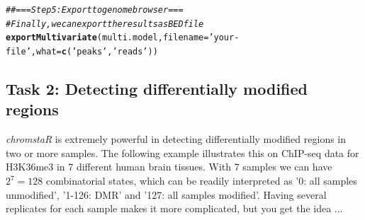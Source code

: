 \documentclass[11pt]{article}\usepackage[]{graphicx}\usepackage[]{color}
\makeatletter
\newcommand{\hlstr}[1]{\textcolor[rgb]{0.192,0.494,0.8}{#1}}%
\newcommand{\hlcom}[1]{\textcolor[rgb]{0.678,0.584,0.686}{\textit{#1}}}%
\newcommand{\hlstd}[1]{\textcolor[rgb]{0.345,0.345,0.345}{#1}}%
\newcommand{\hlkwc}[1]{\textcolor[rgb]{0.333,0.667,0.333}{#1}}%
\newcommand{\hlkwd}[1]{\textcolor[rgb]{0.737,0.353,0.396}{\textbf{#1}}}%
\newenvironment{kframe}{%
 \def\at@end@of@kframe{}%
 \ifinner\ifhmode%
  \def\at@end@of@kframe{\end{minipage}}%
  \begin{minipage}{\columnwidth}%
 \fi\fi%
 \def\FrameCommand##1{\hskip\@totalleftmargin \hskip-\fboxsep
 \colorbox{shadecolor}{##1}\hskip-\fboxsep
     \hskip-\linewidth \hskip-\@totalleftmargin \hskip\columnwidth}%
 \MakeFramed {\advance\hsize-\width
   \@totalleftmargin\z@ \linewidth\hsize
   \@setminipage}}%
 {\par\unskip\endMakeFramed%
 \at@end@of@kframe}
\newenvironment{knitrout}{}{} %
\newcommand{\Rpackage}[1]{{\textit{#1}}}
\makeatother
\begin{document}
\begin{scriptsize}
\begin{knitrout}
\color{fgcolor}\begin{kframe}
\begin{alltt}
\hlcom{## === Step 5: Export to genome browser ===}
\hlcom{# Finally, we can export the results as BED file}
\hlkwd{exportMultivariate}\hlstd{(multi.model,} \hlkwc{filename}\hlstd{=}\hlstr{'your-file'}\hlstd{,} \hlkwc{what}\hlstd{=}\hlkwd{c}\hlstd{(}\hlstr{'peaks'}\hlstd{,}\hlstr{'reads'}\hlstd{))}
\end{alltt}
\end{kframe}
\end{knitrout}
\end{scriptsize}

\subsection{Task 2: Detecting differentially modified regions}

\Rpackage{chromstaR} is extremely powerful in detecting differentially modified regions in two or more samples. The following example illustrates this on ChIP-seq data for H3K36me3 in 7 different human brain tissues. With 7 samples we can have $2^7 = 128$ combinatorial states, which can be readily interpreted as '0: all samples unmodified', '1-126: DMR' and '127: all samples modified'. Having several replicates for each sample makes it more complicated, but you get the idea ...
\end{document}
